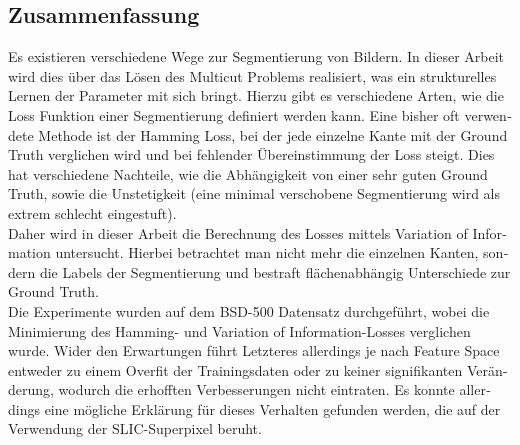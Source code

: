 \begin{otherlanguage}{ngerman}
\chapter*{Zusammenfassung}
Es existieren verschiedene Wege zur Segmentierung von Bildern. In dieser Arbeit wird dies über das Lösen des Multicut Problems realisiert, was ein strukturelles Lernen der Parameter mit sich bringt. Hierzu gibt es verschiedene Arten, wie die Loss Funktion einer Segmentierung definiert werden kann. Eine bisher oft verwendete Methode ist der Hamming Loss, bei der jede einzelne Kante mit der Ground Truth verglichen wird und bei fehlender Übereinstimmung der Loss steigt. Dies hat verschiedene Nachteile, wie die Abhängigkeit von einer sehr guten Ground Truth, sowie die Unstetigkeit (eine minimal verschobene Segmentierung wird als extrem schlecht eingestuft). \\
Daher wird in dieser Arbeit die Berechnung des Losses mittels Variation of Information untersucht. Hierbei betrachtet man nicht mehr die einzelnen Kanten, sondern die Labels der Segmentierung und bestraft flächenabhängig Unterschiede zur Ground Truth. \\
Die Experimente wurden auf dem BSD-500 Datensatz durchgeführt, wobei die Minimierung des Hamming- und Variation of Information-Losses verglichen wurde. Wider den Erwartungen führt Letzteres allerdings je nach Feature Space entweder zu einem Overfit der Trainingsdaten oder zu keiner signifikanten Veränderung, wodurch die erhofften Verbesserungen nicht eintraten. Es konnte allerdings eine mögliche Erklärung für dieses Verhalten gefunden werden, die auf der Verwendung der SLIC-Superpixel beruht.

\end{otherlanguage}

\endgroup			

\vfill